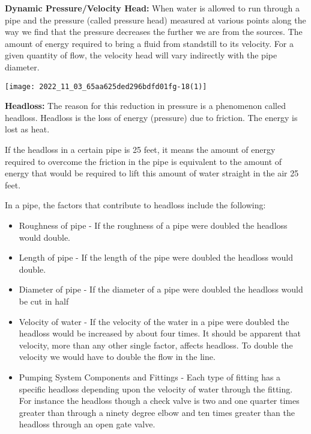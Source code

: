 \textbf{Dynamic Pressure/Velocity Head: }  When water is allowed to run through a pipe and the pressure (called pressure head) measured at various points along the way we find that the pressure decreases the further we are from the sources.  The amount of energy required to bring a fluid from standstill to its velocity. For a given quantity of flow, the velocity head will vary indirectly with the pipe diameter.
\begin{center}
\texttt{[image: 2022\_11\_03\_65aa625ded296bdfd01fg-18(1)]}
\end{center}
\textbf{Headloss: }   The reason for this reduction in pressure is a phenomenon called headloss. Headloss is the loss of energy (pressure) due to friction. The energy is lost as heat.

If the headloss in a certain pipe is 25 feet, it means the amount of energy required to overcome the friction in the pipe is equivalent to the amount of energy that would be required to lift this amount of water straight in the air 25 feet.

In a pipe, the factors that contribute to headloss  include the following:

\begin{itemize}
  \item Roughness of pipe - If the roughness of a pipe were doubled the headloss would double.

  \item Length of pipe - If the length of the pipe were doubled the headloss would double.

  \item Diameter of pipe - If the diameter of a pipe were doubled the headloss would be cut in half

  \item Velocity of water - If the velocity of the water in a pipe were doubled the headloss would be increased by about four times. It should be apparent that velocity, more than any other single factor, affects headloss. To double the velocity we would have to double the flow in the line.
  
  \item Pumping System Components and Fittings - Each type of fitting has a specific headloss depending upon the velocity of water through the fitting. For instance the headloss though a check valve is two and one quarter times greater than through a ninety degree elbow and ten times greater than the headloss through an open gate valve.

\end{itemize}

